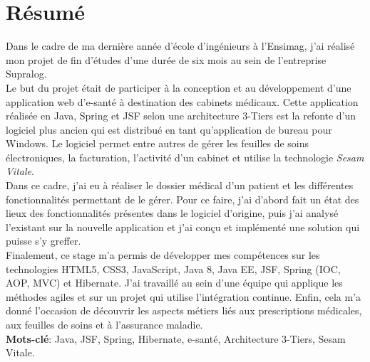 \newpage
\section*{Résumé}  

Dans le cadre de ma dernière année d'école d'ingénieurs à l’Ensimag, j’ai réalisé mon projet de fin d’études d’une durée de six mois au sein de l’entreprise Supralog.\\

Le but du projet était de participer à la conception et au développement d’une application web d’e-santé à destination des cabinets médicaux. Cette application réalisée en Java, Spring et JSF selon une architecture 3-Tiers est la refonte d'un logiciel plus ancien qui est distribué en tant qu'application de bureau pour Windows. Le logiciel permet entre autres de gérer les feuilles de soins électroniques, la facturation, l'activité d'un cabinet et utilise la technologie \textit{\gls{Sesam Vitale}}.\\

Dans ce cadre, j’ai eu à réaliser le dossier médical d'un patient et les différentes fonctionnalités permettant de le gérer. Pour ce faire, j'ai d'abord fait un état des lieux des fonctionnalités présentes dans le logiciel d'origine, puis j'ai analysé l'existant sur la nouvelle application et j'ai conçu et implémenté une solution qui puisse s'y greffer.\\

Finalement, ce stage m'a permis de développer mes compétences sur les technologies \gls{HTML5}, \gls{CSS3}, \gls{JavaScript}, \gls{Java 8}, \gls{Java EE}, \gls{JSF}, \gls{Spring} (\gls{IOC}, \gls{AOP}, \gls{MVC}) et \gls{Hibernate}. J'ai  travaillé au sein d'une équipe qui applique les méthodes agiles et sur un projet qui utilise l'intégration continue. Enfin, cela m'a donné l'occasion de découvrir les aspects métiers liés aux prescriptions médicales, aux feuilles de soins et à l'assurance maladie.\\

\textbf{Mots-clé}: Java, JSF, Spring, Hibernate, e-santé, Architecture 3-Tiers, Sesam Vitale.